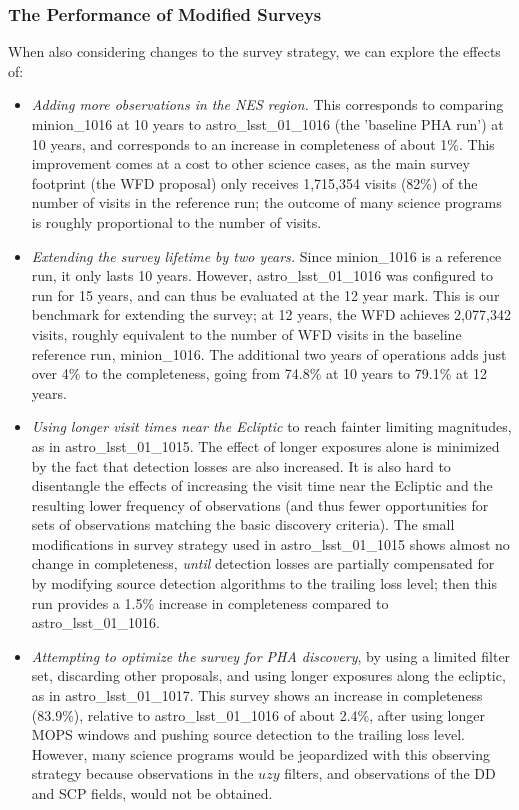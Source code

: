 \subsubsection{The Performance of Modified Surveys} 

When also considering changes to the survey strategy, we can explore the effects of:
\begin{itemize}
\item {\it Adding more observations in the NES region.} This corresponds to comparing minion\_1016 at 10 years to astro\_lsst\_01\_1016 (the 'baseline PHA run') at 10 years, and corresponds to an increase in completeness of about 1\%. This improvement comes at a cost to other science cases, as the main survey footprint (the WFD proposal) only receives 1,715,354 visits (82\%) of the number of visits in the reference run; the outcome of many science programs is roughly proportional to the number of visits. 
\item  {\it Extending the survey lifetime by two years.} Since minion\_1016 is a reference run, it only lasts 10 years. However, astro\_lsst\_01\_1016 was configured to run for 15 years, and can thus be evaluated at the 12 year mark. This is our benchmark for extending the survey; at 12 years, the WFD achieves 2,077,342 visits, roughly equivalent to the number of WFD visits in the baseline reference run, minion\_1016.  The additional two years of operations adds just over 4\% to the completeness, going from 74.8\% at 10 years to 79.1\% at 12 years. 
\item  {\it Using longer visit times near the Ecliptic} to reach fainter limiting magnitudes, as in astro\_lsst\_01\_1015. The effect of longer exposures alone is minimized by the fact that detection losses are also increased. It is also hard to disentangle the effects of increasing the visit time near the Ecliptic and the resulting lower frequency of observations (and thus fewer opportunities for sets of observations matching the basic discovery criteria). The small modifications in survey strategy used in astro\_lsst\_01\_1015 shows almost no change in completeness, {\it until} detection losses are partially compensated for by modifying source detection algorithms to the trailing loss level; then this run provides a 1.5\% increase in completeness compared to astro\_lsst\_01\_1016. 
\item  {\it Attempting to optimize the survey for PHA discovery}, by using a limited filter set, discarding other proposals, and using longer exposures along the ecliptic, as in astro\_lsst\_01\_1017. This survey shows an increase in completeness (83.9\%), relative to astro\_lsst\_01\_1016 of about 2.4\%, after using longer MOPS windows and pushing source detection to the trailing loss level.
However, many science programs would be jeopardized with this observing strategy because observations in the $uzy$ filters,
and observations of the DD and SCP fields, would not be obtained. 
\end{itemize}

